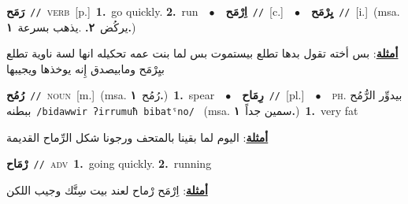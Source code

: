 \documentclass[10pt,a4paper,twoside]{article} %
\begin{document}
\begin{multicols}{2}
{\setlength\topsep{0pt}\textbf{\foreignlanguage{arabic}{رَمَح}}\ {\color{gray}\texttt{//}\color{black}}\ \textsc{verb}\ [p.]\ \textbf{1.}~go quickly.  \textbf{2.}~run\ \ $\bullet$\ \ \setlength\topsep{0pt}\textbf{\foreignlanguage{arabic}{اِرْمَح}}\ {\color{gray}\texttt{//}\color{black}}\ [c.]\ \ $\bullet$\ \ \setlength\topsep{0pt}\textbf{\foreignlanguage{arabic}{يِرْمَح}}\ {\color{gray}\texttt{//}\color{black}}\ [i.]\ \color{gray}(msa. \foreignlanguage{arabic}{يركُض}~\foreignlanguage{arabic}{\textbf{٢.}}  .\foreignlanguage{arabic}{يذهب بسرعة}~\foreignlanguage{arabic}{\textbf{١.}})\color{black}\  \begin{flushright}\color{gray}\foreignlanguage{arabic}{\textbf{\underline{\foreignlanguage{arabic}{أمثلة}}}: بس أخته تقول بدها تطلع بيستموت بس لما بنت عمه تحكيله انها لسة ناوية تطلع بيِرْمَح ومابيصدق إِنه يوخذها ويجيبها}\end{flushright}\color{black}} \vspace{2mm}

{\setlength\topsep{0pt}\textbf{\foreignlanguage{arabic}{رُمُح}}\ {\color{gray}\texttt{//}\color{black}}\ \textsc{noun}\ [m.]\ \color{gray}(msa. \foreignlanguage{arabic}{رُمُح}~\foreignlanguage{arabic}{\textbf{١.}})\color{black}\ \textbf{1.}~spear\ \ $\bullet$\ \ \setlength\topsep{0pt}\textbf{\foreignlanguage{arabic}{رِمَاح}}\ {\color{gray}\texttt{//}\color{black}}\ [pl.]\ \ $\bullet$\ \ \textsc{ph.} \color{gray} \foreignlanguage{arabic}{بيدوِّر الرُّمُح ببطنه}\color{black}\ {\color{gray}\texttt{/{\sffamily bidawwir ʔirrumuħ bibatˤno}/}\color{black}}\ \color{gray} (msa. \foreignlanguage{arabic}{سمين جداً}~\foreignlanguage{arabic}{\textbf{١.}})\color{black}\ \textbf{1.}~very fat\  \begin{flushright}\color{gray}\foreignlanguage{arabic}{\textbf{\underline{\foreignlanguage{arabic}{أمثلة}}}: اليوم لما بقينا بالمتحف ورجونا شكل الرِّماح القديمة}\end{flushright}\color{black}} \vspace{2mm}

{\setlength\topsep{0pt}\textbf{\foreignlanguage{arabic}{رْمَاح}}\ {\color{gray}\texttt{//}\color{black}}\ \textsc{adv}\ \textbf{1.}~going quickly.  \textbf{2.}~running\  \begin{flushright}\color{gray}\foreignlanguage{arabic}{\textbf{\underline{\foreignlanguage{arabic}{أمثلة}}}: اِرْمَح رْماح لعند بيت سِتَّك وجيب اللكن}\end{flushright}\color{black}} \vspace{2mm}


\end{multicols}
\end{document}
